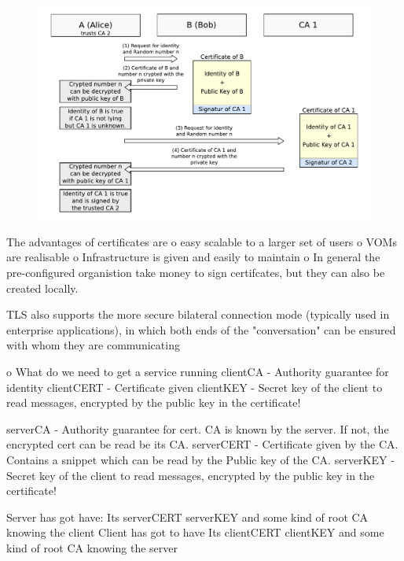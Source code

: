 \begin{figure}[htb]
	\centering%
	\includegraphics[width=13cm]{tex_tls_echoservice/verification.pdf}
	\label{fig:verification_of_certificates}
\end{figure}



The advantages of certificates are
o easy scalable to a larger set of users
o VOMs are realisable
o Infrastructure is given and easily to maintain
o In general the pre-configured organistion take money to sign certifcates, but they can also be created locally.



TLS also supports the more secure bilateral connection mode (typically used in enterprise applications), in which both ends of the "conversation" can be ensured with whom they are communicating




o What do we need to get a service running
clientCA   - Authority guarantee for identity
clientCERT - Certificate given
clientKEY  - Secret key of the client to read messages, encrypted by the public key in the certificate!

serverCA   - Authority guarantee for cert. CA is known by the server. If not, the encrypted cert can be read be its CA.
serverCERT - Certificate given by the CA. Contains a snippet which can be read by the Public key of the CA.
serverKEY  - Secret key of the client to read messages, encrypted by the public key in the certificate!


Server has got have:
Its  serverCERT serverKEY and some kind of root CA knowing the client
Client has got to have
Its  clientCERT clientKEY and some kind of root CA knowing the server













